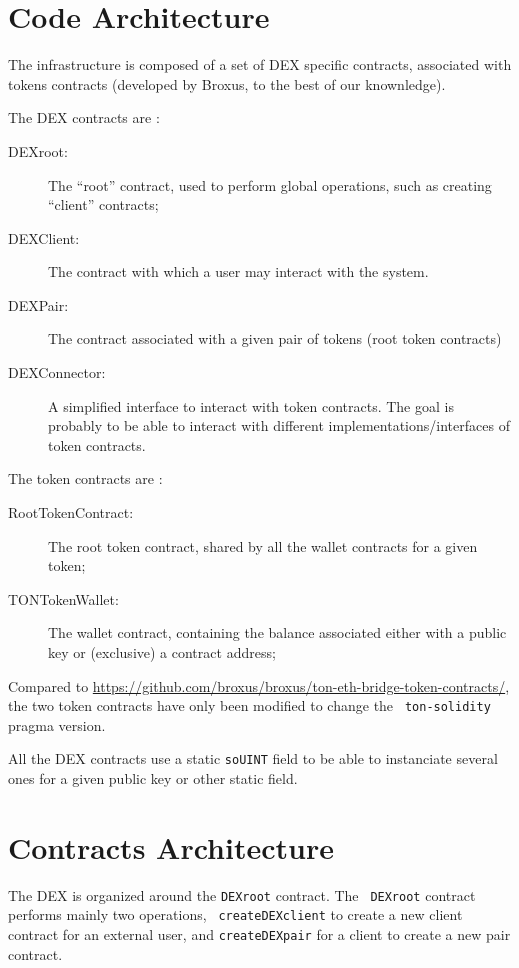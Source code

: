
\section{Code Architecture}

The infrastructure is composed of a set of DEX specific contracts,
associated with tokens contracts (developed by Broxus, to the best of
our knownledge).

The DEX contracts are :

\begin{description}
\item[DEXroot:] The ``root'' contract, used to perform global
  operations, such as creating ``client'' contracts;
\item[DEXClient:] The contract with which a user may interact with the
  system.
\item[DEXPair:] The contract associated with a given pair of tokens
  (root token contracts)
\item[DEXConnector:] A simplified interface to interact with token
  contracts. The goal is probably to be able to interact with
  different implementations/interfaces of token contracts.
\end{description}

The token contracts are :

\begin{description}
\item[RootTokenContract:] The root token contract, shared by all the
  wallet contracts for a given token;
\item[TONTokenWallet:] The wallet contract, containing the balance
  associated either with a public key or (exclusive) a contract
  address;
\end{description}

Compared to
\url{https://github.com/broxus/broxus/ton-eth-bridge-token-contracts/},
the two token contracts have only been modified to change the {\tt
  ton-solidity} pragma version.

All the DEX contracts use a static {\tt soUINT} field to be able to
instanciate several ones for a given public key or other static field.

\section{Contracts Architecture}

The DEX is organized around the {\tt DEXroot} contract. The {\tt
  DEXroot} contract performs mainly two operations, {\tt
  createDEXclient} to create a new client contract for an external
user, and {\tt createDEXpair} for a client to create a new pair
contract.

